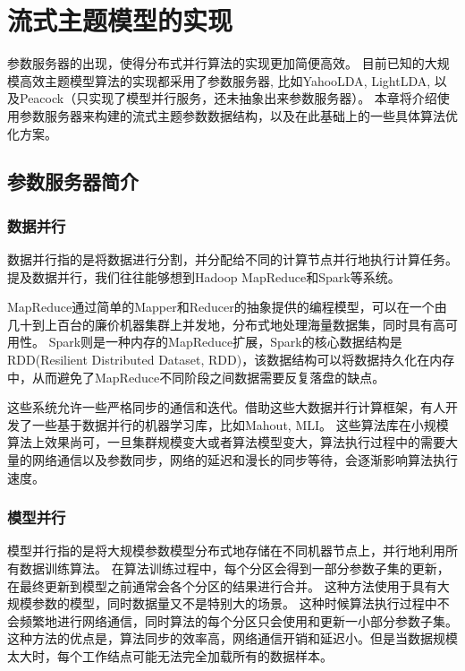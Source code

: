 \chapter{流式主题模型的实现}
\label{chapter:implement}
参数服务器的出现，使得分布式并行算法的实现更加简便高效。
目前已知的大规模高效主题模型算法的实现都采用了参数服务器\cite{li2014scaling}, 比如YahooLDA\cite{ahmed2012scalable}, LightLDA\cite{yuan2015lightlda}, 以及Peacock\cite{li2014scaling}（只实现了模型并行服务，还未抽象出来参数服务器）。
本章将介绍使用参数服务器来构建的流式主题参数数据结构，以及在此基础上的一些具体算法优化方案。

\section{参数服务器简介}
\subsection{数据并行}
数据并行指的是将数据进行分割，并分配给不同的计算节点并行地执行计算任务。
提及数据并行，我们往往能够想到Hadoop MapReduce和Spark等系统。

MapReduce通过简单的Mapper和Reducer的抽象提供的编程模型，可以在一个由几十到上百台的廉价机器集群上并发地，分布式地处理海量数据集，同时具有高可用性。
Spark则是一种内存的MapReduce扩展，Spark的核心数据结构是RDD(Resilient Distributed Dataset, RDD)，该数据结构可以将数据持久化在内存中，从而避免了MapReduce不同阶段之间数据需要反复落盘的缺点。

这些系统允许一些严格同步的通信和迭代。借助这些大数据并行计算框架，有人开发了一些基于数据并行的机器学习库，比如Mahout\cite{mahout}, MLI\cite{sparks2013mli}。
这些算法库在小规模算法上效果尚可，一旦集群规模变大或者算法模型变大，算法执行过程中的需要大量的网络通信以及参数同步，网络的延迟和漫长的同步等待，会逐渐影响算法执行速度。

\subsection{模型并行}
模型并行指的是将大规模参数模型分布式地存储在不同机器节点上，并行地利用所有数据训练算法。
在算法训练过程中，每个分区会得到一部分参数子集的更新，在最终更新到模型之前通常会各个分区的结果进行合并。
这种方法使用于具有大规模参数的模型，同时数据量又不是特别大的场景。
这种时候算法执行过程中不会频繁地进行网络通信，同时算法的每个分区只会使用和更新一小部分参数子集。这种方法的优点是，算法同步的效率高，网络通信开销和延迟小。但是当数据规模太大时，每个工作结点可能无法完全加载所有的数据样本。

